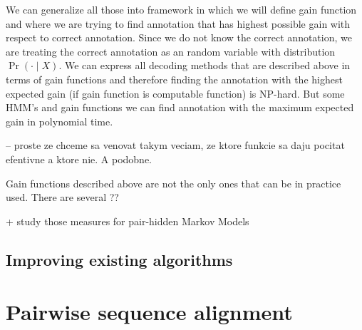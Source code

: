 We can generalize all those into framework in which we will define gain function
and where we are trying to find annotation that has highest possible gain with
respect to correct annotation. Since we do not know the correct annotation, we
are treating the correct annotation as an random variable with distribution
$\Pr\left(\cdot\mid X\right)$. We can express all decoding methods that are
described above in terms of gain functions and therefore finding the annotation
with the highest expected gain (if gain function is computable function) is
NP-hard. But some HMM's and gain functions we can find annotation with the
maximum expected gain in polynomial time. 

-- proste ze chceme sa venovat takym veciam, ze ktore funkcie sa daju pocitat
efentivne a ktore nie. A podobne.

Gain functions described above are not the only ones that can be in practice
used. There are several ??

+ study those measures for pair-hidden Markov Models

%

\subsection{Improving existing algorithms}







\section{Pairwise sequence alignment}


\label{LastPage}

